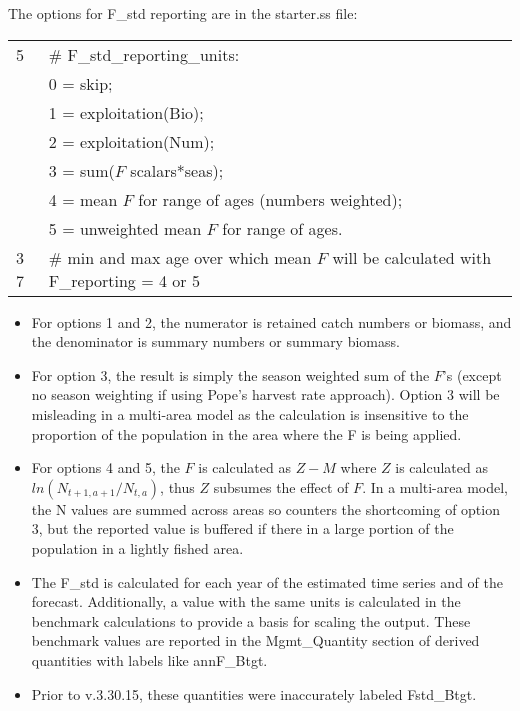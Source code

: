 The options for F\_std reporting are in the starter.ss file:
\begin{center}
	\begin{longtable}{p{2cm} p{12cm}}
		\hline
		5 & \# F\_std\_reporting\_units: \Tstrut\\
		  & 0 = skip; \\
		  & 1 = exploitation(Bio); \\
		  & 2 = exploitation(Num); \\ 
		  & 3 = sum($F$ scalars*seas); \\
		  & 4 = mean $F$ for range of ages (numbers weighted); \\
		  & 5 = unweighted mean $F$ for range of ages. \Bstrut\\
		\hline
		3 7 & \# min and max age over which mean $F$ will be calculated with F\_reporting = 4 or 5 \Tstrut\Bstrut\\
		\hline
	\end{longtable}
	\vspace*{-1.7\baselineskip}
\end{center}

\begin{itemize}
	\item For options 1 and 2, the numerator is retained catch numbers or biomass, and the denominator is summary numbers or summary biomass.
	\item For option 3, the result is simply the season weighted sum of the $F$'s (except no season weighting if using Pope's harvest rate approach). Option 3 will be misleading in a multi-area model as the calculation is insensitive to the proportion of the population in the area where the F is being applied.
	\item For options 4 and 5, the $F$ is calculated as $Z-M$ where $Z$ is calculated as $ln(N_{t+1,a+1}/N_{t,a})$, thus $Z$ subsumes the effect of $F$. In a multi-area model, the N values are summed across areas so counters the shortcoming of option 3, but the reported value is buffered if there in a large portion of the population in a lightly fished area.
	\item The F\_std is calculated for each year of the estimated time series and of the forecast. Additionally, a value with the same units is calculated in the benchmark calculations to provide a basis for scaling the output. These benchmark values are reported in the Mgmt\_Quantity section of derived quantities with labels like annF\_Btgt. 
	\item Prior to v.3.30.15, these quantities were inaccurately labeled Fstd\_Btgt.
\end{itemize}

